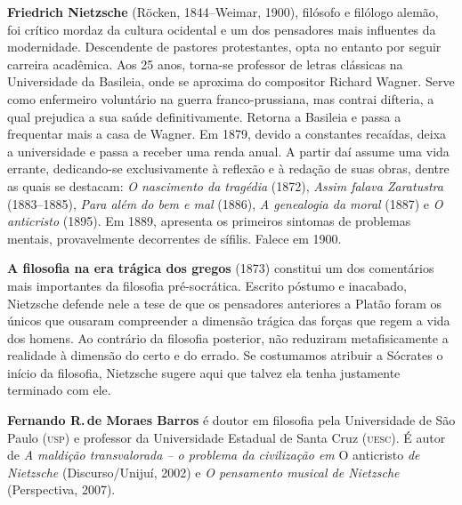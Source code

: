 \textbf{Friedrich Nietzsche} (Röcken, 1844--Weimar, 1900), filósofo 
e filólogo alemão, foi crítico mordaz da cultura ocidental 
e um dos pensadores mais influentes da modernidade. Descendente de pastores 
protestantes, opta no entanto por seguir carreira acadêmica. 
Aos 25 anos, torna-se professor de letras clássicas na Universidade 
da Basileia, onde se aproxima do compositor Richard Wagner. Serve 
como enfermeiro voluntário na guerra franco-prussiana, mas contrai 
difteria, a qual prejudica a sua saúde definitivamente. Retorna a 
Basileia e passa a frequentar mais a casa de Wagner. Em 
1879, devido a constantes recaídas, deixa a universidade e passa a 
receber uma renda anual. A partir daí assume uma vida errante, 
dedicando-se exclusivamente à reflexão e à redação de suas obras, 
dentre as quais se destacam: \textit{O nascimento da tragédia} (1872), 
\textit{Assim falava Zaratustra} (1883--1885), \textit{Para além do bem e mal} (1886), 
\textit{A genealogia da moral} (1887) e \textit{O anticristo} (1895). Em 1889, 
apresenta os primeiros sintomas de problemas mentais, provavelmente 
decorrentes de sífilis. Falece em 1900.

\textbf{A filosofia na era trágica dos gregos} (1873) constitui um dos comentários 
mais importantes da filosofia pré{}-socrática. Escrito póstumo e inacabado, Nietzsche defende nele 
a tese de que os pensadores anteriores a Platão foram os únicos que ousaram compreender a dimensão 
trágica das forças que regem a vida dos homens. Ao contrário da filosofia posterior, não reduziram 
metafisicamente a realidade à dimensão do certo e do errado. Se costumamos atribuir a Sócrates o início 
da filosofia, Nietzsche sugere aqui que talvez ela tenha justamente terminado com ele.

\textbf{Fernando R.\,de Moraes Barros} é doutor em filosofia pela Universidade 
de São Paulo (\textsc{usp}) e professor da Universidade Estadual de Santa Cruz 
(\textsc{uesc}). É autor de \textit{A maldição transvalorada -- o problema da civilização 
em} O anticristo \textit{de Nietzsche} (Discurso/Unijuí, 2002) 
e \textit{O pensamento musical de Nietzsche} (Perspectiva, 2007).

